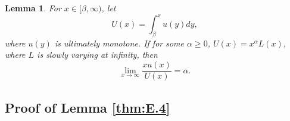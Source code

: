 \documentclass[12pt,a4paper]{amsart}
\numberwithin{equation}{section}
\theoremstyle{plain}
\newtheorem{lem}[thm]{Lemma}
\theoremstyle{definition}
\theoremstyle{remark}
\begin{document}
\begin{lem}\label{lem:tail}
For $x\in [\beta,\infty)$, let
\[
U(x)=\int_\beta^xu(y)dy,
\]
where $u(y)$ is ultimately monotone.  If for some $\alpha\geq 0$, $U(x)=x^\alpha L(x)$,  where $L$ is slowly varying at infinity, then
\[
\lim_{x\to\infty}\dfrac{xu(x)}{U(x)}=\alpha.
\]
\end{lem}

\subsection{Proof of Lemma   \ref{thm:E.4}}

\begin{comment}
\begin{proof}[Proof of Lemma \ref{lem:reverse of the spine}]
	Since $E$ is a Polish space, we only need to prove that for any fixed $T>0$, $n \in \mathbb N$ and $0= t_1\leq \dots \leq t_n \leq T$,
	 The following identity holds
\[
	\widetilde \Pi_{\phi \cdot \nu}\{Y_{T-t_i}\in B_i,\forall i=1,\dots, n\}
	\overset{d}{=}\widehat \Pi_{\phi \cdot \nu}\{\widehat Y_{t_i}\in B_i,\forall i=1,\dots, n\},
\]
for arbitrary $B_i \in \mathscr B(E)$,  $i=1,\dots, n$.
	In fact, on one hand, we have
\begin{align}
	&\widetilde \Pi_{\phi \cdot \nu}\{Y_{T-t_i}\in B_i,\forall i=1,\dots, n\}
 \\&= \int_{y_n\in B_n} \phi(y_n)\widehat\phi(y_n) m(dy_n)\int_{y_{n-1}\in B_{n-1}} \tilde p_{t_n - t_{n-1}}(y_n,y_{n-1})m(dy_{n-1})
	\\& \qquad \dots \int_{y_1\in B_1} \tilde p_{t_2 - t_1}(y_2,y_1)m(dy_1)
	\\&= \int_{E^n} \Big(\prod_{i=1}^n \mathbf 1_{\{y_i\in B_i\}}\Big)\cdot\Big(\prod_{i=1}^{n-1} \tilde
 p_{t_{i+1}-t_i}(y_{i+1},y_i)\Big)\cdot\phi(y_n)\widehat\phi(y_n)\cdot \Big(\prod_{i=1}^nm(dy_i)\Big).
\end{align}
	On the other hand, we have
\begin{align}
	&\widehat \Pi_{\phi\cdot\nu}\{Y_{t_i}\in B_i, \forall i = 1,\dots, n\}
 \\&= \int_{y_1\in B_1} \phi(y_1)\widehat \phi(y_1)m(dy_1) \int_{y_2\in B_2} \hat p_{t_2-t_1}(y_1,y_2)m(dy_2)
	\\&\qquad \dots\int_{y_n\in B_n}\hat p_{t_n-t_{n-1}}(y_{n-1},y_n)m(dy_n)
	\\&= \int_{y_1\in  B_1} \phi(y_1)\widehat \phi(y_1)m(dy_1) \int_{y_2\in B_2} \tilde p_{t_2-t_1}(y_2,y_1)\frac{\phi(y_2)\widehat\phi(y_2)}{\phi(y_1)
     \widehat \phi(y_1)}m(dy_2)
 \\&\qquad \dots\int_{y_n\in B_n}\tilde p_{t_n-t_{n-1}}(y_n,y_{n-1})\frac{\phi(y_n)\widehat\phi(y_n)}{\phi(y_{n-1})\widehat\phi(y_{n-1})}m(dy_n)
\\&= \int_{E^n} \Big(\prod_{i=1}^n \mathbf 1_{\{y_i\in B_i\}}\Big)\cdot\Big(\prod_{i=1}^{n-1} \tilde p_{t_{i+1}-t_i}(y_{i+1},y_i)\Big)\cdot\phi(y_n)\widehat\phi(y_n)\cdot \Big(\prod_{i=1}^n m(dy_i)\Big).
\qedhere
\end{align}
\end{proof}
\end{comment}
\end{document}
